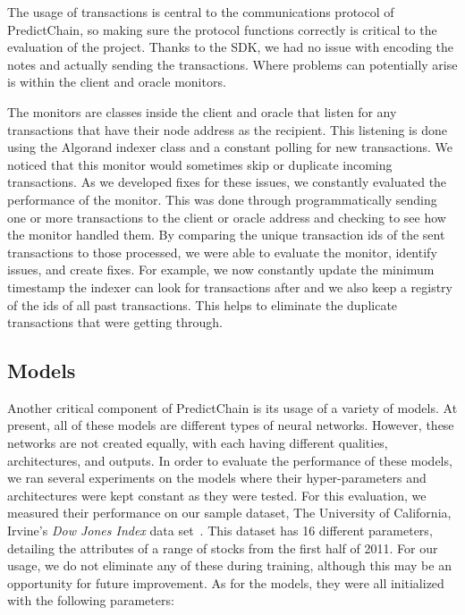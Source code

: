 \documentclass{ledger}
\begin{document}
The usage of transactions is central to the communications protocol of PredictChain, so making sure the protocol
functions correctly is critical to the evaluation of the project.  Thanks to the SDK, we had no issue with encoding the
notes and actually sending the transactions.  Where problems can potentially arise is within the
client and oracle monitors.

The monitors are classes inside the client and oracle that listen for any transactions that have their node address
as the recipient.  This listening is done using the Algorand indexer class and a constant polling for new transactions.
We noticed that this monitor would sometimes skip or duplicate incoming transactions.  As we developed fixes for
these issues, we constantly evaluated the performance of the monitor.  This was done through programmatically sending
one or more transactions to the client or oracle address and checking to see how the monitor handled them.  By comparing
the unique transaction ids of the sent transactions to those processed, we were able to evaluate the monitor,
identify issues, and create fixes. For example, we now constantly update the minimum timestamp the indexer can look
for transactions after and we also keep a registry of the ids of all past transactions.  This helps to eliminate
the duplicate transactions that were getting through.

\subsection{Models}

Another critical component of PredictChain is its usage of a variety of models.  At present, all of these models
are different types of neural networks.  However, these networks are not created equally, with each having different
qualities, architectures, and outputs.  In order to evaluate the performance of these models, we ran several experiments
on the models where their hyper-parameters and architectures were kept constant as they were tested.  For this
evaluation, we measured their performance on our sample dataset, The University of California, Irvine's \textit{Dow Jones
Index} data set~\cite{dowJones}.  This dataset has 16 different parameters, detailing the attributes of a range of
stocks from the first half of 2011.  For our usage, we do not eliminate any of these during training, although this
may be an opportunity for future improvement.  As for the models, they were all initialized with the following parameters:
\end{document}
